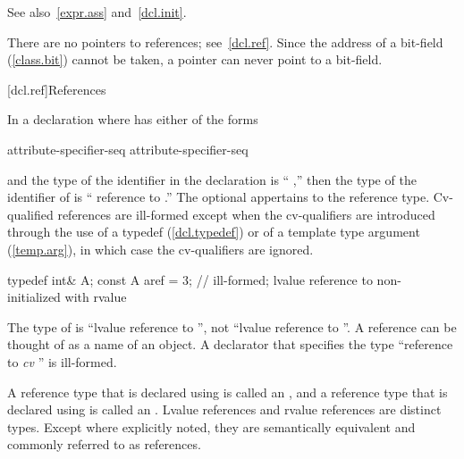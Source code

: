 \pnum
See also~\ref{expr.ass} and~\ref{dcl.init}.

\pnum
\enternote
There are no pointers to references; see~\ref{dcl.ref}.
Since the address of a bit-field (\ref{class.bit}) cannot be taken,
a pointer can never point to a bit-field.
\exitnote

[dcl.ref]{References}%

\pnum
In a declaration
where
has either of the forms

\begin{ncsimplebnf}
\terminal{\&} attribute-specifier-seq\opt {}\br
\terminal{\&\&} attribute-specifier-seq\opt {}
\end{ncsimplebnf}

and the type of the identifier in the declaration
is ``
,''
then the type of the identifier of
is `` reference to
.''
The optional  appertains to the reference type.
Cv-qualified references are ill-formed except when the cv-qualifiers
are introduced through the use of a typedef (\ref{dcl.typedef}) or
of a template type argument (\ref{temp.arg}),
in which case the cv-qualifiers are ignored.
\enterexample

\begin{codeblock}
typedef int& A;
const A aref = 3;   // ill-formed; lvalue reference to non- initialized with rvalue
\end{codeblock}

The type of
is ``lvalue reference to '',
not ``lvalue reference to ''.
\exitexample
{}%
\enternote
A reference can be thought of as a name of an object.
\exitnote
A declarator that specifies the type
``reference to \textit{cv} ''
is ill-formed.


\pnum
{}%
%
A reference type that is declared using \tcode{\&} is called an
, and a reference type that
is declared using \tcode{\&\&} is called an
. Lvalue references and
rvalue references are distinct types. Except where explicitly noted, they are
semantically equivalent and commonly referred to as references.

\pnum
{}%
%
\enterexample

